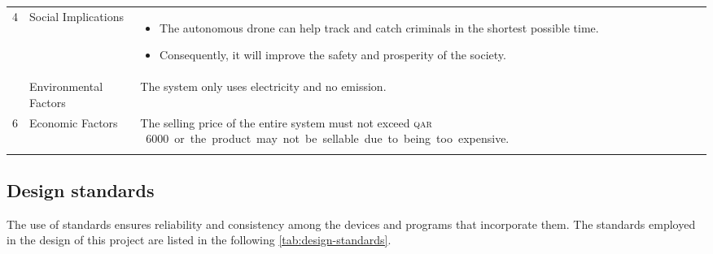 \documentclass[../main.tex]{subfiles}
\begin{document}
\begin{table}[H]
\begin{tabularx}{\textwidth}{ c p{4cm} X }
        4 
            & Social Implications
                & %
                \hspace{-0.7cm} \begin{minipage} [t] {0.65\textwidth} 
                \begin{itemize}
                  \item The autonomous drone can help track and catch
                      criminals in the shortest possible time.%
                      \vspace{-0.2cm}
                  \item Consequently, it will improve the safety and
                      prosperity of the society.
               \end{itemize} 
               \end{minipage}
                \\ \addlinespace
        5 
            & Environmental Factors
                & The system only uses electricity 
                and no emission. \\
                \addlinespace
        
        6 
            & Economic Factors
                & The selling price of the entire 
                system must not exceed 
                \SI{6000}[\textsc{qar}\,]  
                or the product may not be sellable 
                due to being too expensive. \\
                \addlinespace
        
        \bottomrule		
    \end{tabularx}
\end{table}
\subsection{Design standards}

The use of standards ensures reliability and consistency
among the devices and programs that incorporate them.
The standards employed in the design of this project are
listed in the following \cref{tab:design-standards}.
\end{document}
